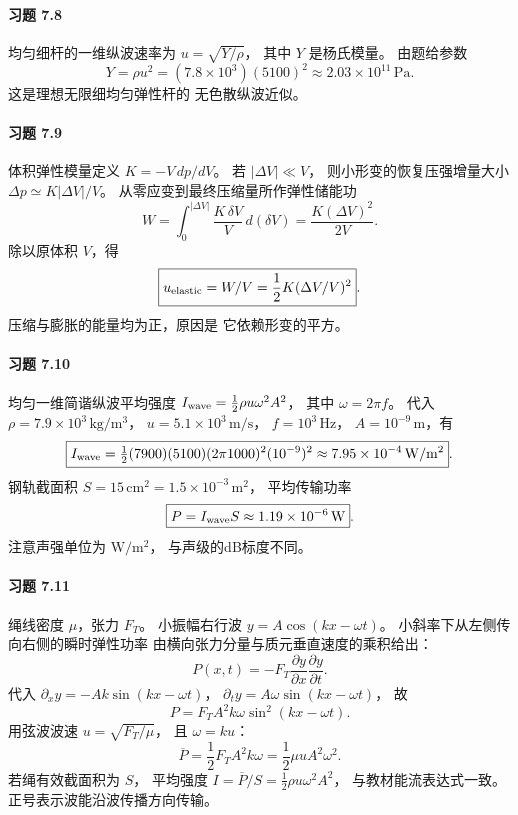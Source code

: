 \paragraph{习题 7.8}
均匀细杆的一维纵波速率为
\(u=\sqrt{Y/\rho}\)，
其中 \(Y\) 是杨氏模量。
由题给参数
\[
 \boxed{Y=\rho u^2
 =(7.8\times10^3)(5100)^2
 \approx2.03\times10^{11}\,\mathrm{Pa}}.
\]
这是理想无限细均匀弹性杆的
无色散纵波近似。

\paragraph{习题 7.9}
体积弹性模量定义
\(K=-V\,dp/dV\)。
若 \(|\Delta V|\ll V\)，
则小形变的恢复压强增量大小
\(\Delta p\simeq K|\Delta V|/V\)。
从零应变到最终压缩量所作弹性储能功
\[
 W=\int_0^{|\Delta V|}
 \frac{K\,\delta V}{V}\,d(\delta V)
 =\frac{K(\Delta V)^2}{2V}.
\]
除以原体积 \(V\)，得
\[
 \boxed{u_{\rm elastic}
 =W/V=\frac12K(\Delta V/V)^2}.
\]
压缩与膨胀的能量均为正，原因是
它依赖形变的平方。

\paragraph{习题 7.10}
均匀一维简谐纵波平均强度
\(I_{\rm wave}=\tfrac12\rho u\omega^2A^2\)，
其中 \(\omega=2\pi f\)。
代入
\(\rho=7.9\times10^3\,\mathrm{kg/m^3}\)，
\(u=5.1\times10^3\,\mathrm{m/s}\)，
\(f=10^3\,\mathrm{Hz}\)，
\(A=10^{-9}\,\mathrm m\)，有
\[
 \boxed{I_{\rm wave}
 =\tfrac12(7900)(5100)(2\pi1000)^2(10^{-9})^2
 \approx7.95\times10^{-4}\,\mathrm{W/m^2}}.
\]
钢轨截面积
\(S=15\,\mathrm{cm^2}
 =1.5\times10^{-3}\,\mathrm{m^2}\)，
平均传输功率
\[
 \boxed{P=I_{\rm wave}S
 \approx1.19\times10^{-6}\,\mathrm W}.
\]
注意声强单位为 \(\mathrm{W/m^2}\)，
与声级的dB标度不同。

\paragraph{习题 7.11}
绳线密度 \(\mu\)，张力 \(F_T\)。
小振幅右行波
\(y=A\cos(kx-\omega t)\)。
小斜率下从左侧传向右侧的瞬时弹性功率
由横向张力分量与质元垂直速度的乘积给出：
\[
 P(x,t)=-F_T\frac{\partial y}{\partial x}
 \frac{\partial y}{\partial t}.
\]
代入
\(\partial_xy=-Ak\sin(kx-\omega t)\)，
\(\partial_ty=A\omega\sin(kx-\omega t)\)，
故
\[
 P=F_TA^2k\omega
 \sin^2(kx-\omega t).
\]
用弦波波速
\(u=\sqrt{F_T/\mu}\)，
且 \(\omega=ku\)：
\[
 \boxed{\overline P=
 \frac12F_TA^2k\omega
 =\frac12\mu uA^2\omega^2}.
\]
若绳有效截面积为 \(S\)，
平均强度 \(I=\overline P/S
 =\tfrac12\rho u\omega^2A^2\)，
与教材能流表达式一致。
正号表示波能沿波传播方向传输。

